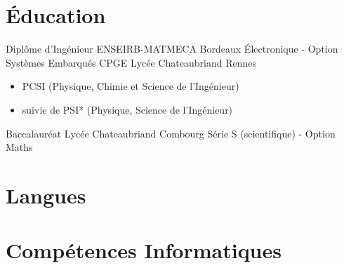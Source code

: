 \documentclass[11pt,a4paper,sans]{moderncv}
\begin{document}
\section{Éducation}
	{Diplôme d'Ingénieur}
	{ENSEIRB-MATMECA}
	{Bordeaux}
	{}
	{Électronique - Option Systèmes Embarqués}
	{CPGE}
	{Lycée Chateaubriand}
	{Rennes}
	{}
	{
		\begin{itemize}
		\item PCSI (Physique, Chimie et Science de l'Ingénieur)
		\item suivie de PSI* (Physique, Science de l'Ingénieur)
		\end{itemize}
	}
	{Baccalauréat}
	{Lycée Chateaubriand}
	{Combourg}
	{}
	{Série S (scientifique) - Option Maths}

\section{Langues}

\section{Compétences Informatiques}
\end{document}
